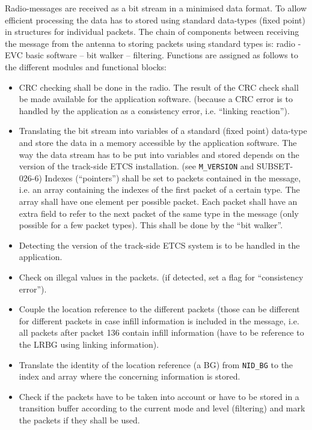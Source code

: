 Radio-messages are received as a bit stream in a minimised data format. To allow efficient processing the data has to stored using standard data-types (fixed point) in structures for individual packets. The chain of components between receiving the message from the antenna to storing packets using standard types is:
radio - EVC basic software – bit walker – filtering.
Functions are assigned as follows to the different modules and functional blocks:
\begin{itemize}
\item CRC checking shall be done in the radio. The result of the CRC check shall be made available for the application software.
 (because a CRC error is to handled by the application as a consistency error, i.e. “linking reaction”).
\item Translating the bit stream into variables of a standard (fixed point) data-type and store the data in a memory accessible by the application software. The way the data stream has to be put into variables and stored depends on the version of the track-side ETCS installation. (see \verb+M_VERSION+ and SUBSET-026-6)
Indexes (``pointers'') shall be set to packets contained in the message, i.e. an array containing  the indexes of the first packet of a certain type. The array shall have one element per possible packet. Each packet shall have an extra field to refer to the next packet of the same type in the message (only possible for a few packet types).
This shall be done by the “bit walker”.
\item Detecting the version of the track-side ETCS system is to be handled in the application.
\item Check on illegal values in the packets. (if detected, set a flag for “consistency error”).
\item Couple the location reference to the different packets (those can be different for different packets in case infill information is included in the message, i.e. all packets after packet 136 contain infill information (have to be reference to the LRBG using linking information).
\item Translate the identity of the location reference (a BG) from \verb+NID_BG+ to the index and array where the concerning information is stored.
\item Check if the packets have to be taken into account or have to be stored in a transition buffer according to the current mode and level (filtering) and mark the packets if they shall be used.
\end{itemize}


